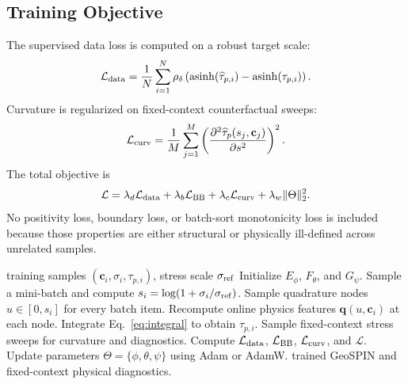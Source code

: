 \documentclass[journal]{IEEEtran}
\begin{document}
\subsection{Training Objective}
The supervised data loss is computed on a robust target scale:
\begin{equation}
\mathcal{L}_{\rm data}=\frac{1}{N}\sum_{i=1}^{N}\rho_{\delta}\left(\operatorname{asinh}(\widehat{\tau}_{p,i})-\operatorname{asinh}(\tau_{p,i})\right).
\label{eq:ldata}
\end{equation}
Curvature is regularized on fixed-context counterfactual sweeps:
\begin{equation}
\mathcal{L}_{\rm curv}=\frac{1}{M}\sum_{j=1}^{M}\left(\frac{\partial^2\widehat{\tau}_p(s_j,\mathbf{c}_j)}{\partial s^2}\right)^2.
\label{eq:lcurv}
\end{equation}
The total objective is
\begin{equation}
\mathcal{L}=\lambda_d\mathcal{L}_{\rm data}+\lambda_b\mathcal{L}_{\rm BB}+\lambda_c\mathcal{L}_{\rm curv}+\lambda_w\|\Theta\|_2^2.
\label{eq:ltotal}
\end{equation}
No positivity loss, boundary loss, or batch-sort monotonicity loss is included because those properties are either structural or physically ill-defined across unrelated samples.

\begin{algorithm}[t]
\caption{GeoSPIN Peak-Strength Training}
\label{alg:geospin_train}
\begin{algorithmic}[1]
\REQUIRE training samples $(\mathbf{c}_i,\sigma_i,\tau_{p,i})$, stress scale $\sigma_{\rm ref}$
\STATE Initialize $E_{\phi}$, $F_{\theta}$, and $G_{\psi}$.
\STATE Sample a mini-batch and compute $s_i=\log(1+\sigma_i/\sigma_{\rm ref})$.
\STATE Sample quadrature nodes $u\in[0,s_i]$ for every batch item.
\STATE Recompute online physics features $\mathbf{q}(u,\mathbf{c}_i)$ at each node.
\STATE Integrate Eq.~\eqref{eq:integral} to obtain $\widehat{\tau}_{p,i}$.
\STATE Sample fixed-context stress sweeps for curvature and diagnostics.
\STATE Compute $\mathcal{L}_{\rm data}$, $\mathcal{L}_{\rm BB}$, $\mathcal{L}_{\rm curv}$, and $\mathcal{L}$.
\STATE Update parameters $\Theta=\{\phi,\theta,\psi\}$ using Adam or AdamW.
\ENDFOR
\RETURN trained GeoSPIN and fixed-context physical diagnostics.
\end{algorithmic}
\end{algorithm}
\end{document}
